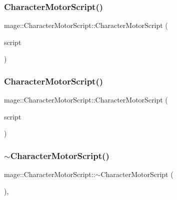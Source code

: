 \subsubsection{\texorpdfstring{Character\+Motor\+Script()}{CharacterMotorScript()}\hspace{0.1cm}{\footnotesize\ttfamily [2/3]}}
{\footnotesize\ttfamily mage\+::\+Character\+Motor\+Script\+::\+Character\+Motor\+Script (\begin{DoxyParamCaption}\item[{const \hyperlink{classmage_1_1_character_motor_script}{Character\+Motor\+Script} \&}]{script }\end{DoxyParamCaption})\hspace{0.3cm}{\ttfamily [delete]}}

\hypertarget{classmage_1_1_character_motor_script_a04180b7c00a5c1c309fe8b1b44f6fd10}{}\label{classmage_1_1_character_motor_script_a04180b7c00a5c1c309fe8b1b44f6fd10} 
\subsubsection{\texorpdfstring{Character\+Motor\+Script()}{CharacterMotorScript()}\hspace{0.1cm}{\footnotesize\ttfamily [3/3]}}
{\footnotesize\ttfamily mage\+::\+Character\+Motor\+Script\+::\+Character\+Motor\+Script (\begin{DoxyParamCaption}\item[{\hyperlink{classmage_1_1_character_motor_script}{Character\+Motor\+Script} \&\&}]{script }\end{DoxyParamCaption})\hspace{0.3cm}{\ttfamily [default]}}

\hypertarget{classmage_1_1_character_motor_script_a97b98828d964a0ce38cc424bbf080303}{}\label{classmage_1_1_character_motor_script_a97b98828d964a0ce38cc424bbf080303} 
\subsubsection{\texorpdfstring{$\sim$\+Character\+Motor\+Script()}{~CharacterMotorScript()}}
{\footnotesize\ttfamily mage\+::\+Character\+Motor\+Script\+::$\sim$\+Character\+Motor\+Script (\begin{DoxyParamCaption}{ }\end{DoxyParamCaption})\hspace{0.3cm}{\ttfamily [virtual]}, {\ttfamily [default]}}



